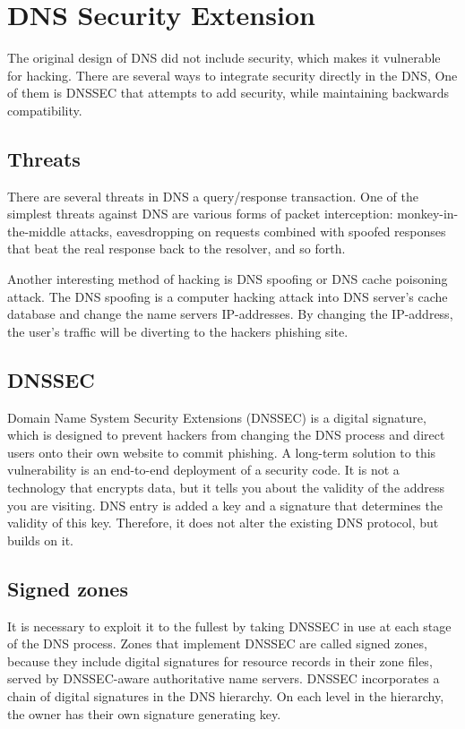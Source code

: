 \section{DNS Security Extension}
\label{DNS Security Extensions}
The original design of DNS did not include security, which makes it vulnerable for hacking.
There are several ways to integrate security directly in the DNS, One of them is DNSSEC that attempts to add security, while maintaining backwards compatibility.

\subsection{Threats}
There are several threats in DNS a query/response transaction.
One of the simplest threats against DNS are various forms of packet interception: monkey-in-the-middle attacks, eavesdropping on requests combined with spoofed responses that beat the real response back to the resolver, and so forth.

Another interesting method of hacking is DNS spoofing or DNS cache poisoning attack.
The DNS spoofing is a computer hacking attack into DNS server's cache database and change the name servers IP-addresses. By changing the IP-address, the user's traffic will be diverting to the hackers phishing site.

\subsection{DNSSEC}
Domain Name System Security Extensions (DNSSEC) is a digital signature, which is designed to prevent hackers from changing the DNS process and direct users onto their own website to commit phishing. A long-term solution to this vulnerability is an end-to-end deployment of a security code. It is not a technology that encrypts data, but it tells you about the validity of the address you are visiting. DNS entry is added a key and a signature that determines the validity of this key. Therefore, it does not alter the existing DNS protocol, but builds on it.

\subsection{Signed zones}
It is necessary to exploit it to the fullest by taking DNSSEC in use at each stage of the DNS process.
Zones that implement DNSSEC are called signed zones, because they include digital signatures for resource records in their zone files, served by DNSSEC-aware authoritative name servers.
DNSSEC incorporates a chain of digital signatures in the DNS hierarchy. On each level in the hierarchy, the owner has their own signature generating key.

